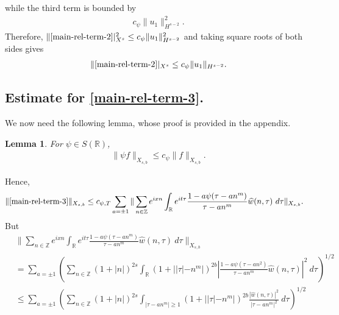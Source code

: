 \documentclass[12pt,reqno]{amsart}
\numberwithin{equation}{section}  %
\numberwithin{figure}{section}
\newcommand{\rr}{\mathbb{R}}
\newcommand{\zz}{\mathbb{Z}}
\newcommand{\wh}{\widehat}
\theoremstyle{plain}
\newtheorem{lemma}{Lemma}
\theoremstyle{definition}
\theoremstyle{remark}
\begin{document}
while the third term is bounded by  
%
%
\begin{equation*}
\begin{split}
  c_{\psi} \| u_{1} \|_{H^{s-2}}^{2}.
\end{split}
\end{equation*}
%
%
Therefore, 
$\|\eqref{main-rel-term-2}|_{X^{s}}^{2} \le c_{\psi}
\|u_{1}\|_{H^{s-2}}^2$ and
taking square roots of both sides gives
%
%
\begin{equation*}
  \begin{split}
    \|\eqref{main-rel-term-2}|_{X^{s}} \le c_{\psi}
    \|u_{1}\|_{H^{s-2}}.
  \end{split}
\end{equation*}
%
%
%
%
\subsection{Estimate for \eqref{main-rel-term-3}.}
We now need the following lemma, whose proof is provided in the appendix.
%
%
%
%
%
%
%
%
\begin{lemma}
\label{lem:schwartz-mult}
	For $\psi \in S(\rr)$,
%
%
\begin{equation}
	\label{schwartz-mult}
	\begin{split}
    \|\psi f \|_{X_{s,b}} \le c_{\psi} \|f \|_{X_{s,b}}.
	\end{split}
\end{equation}
%
%
\end{lemma}
%
%
Hence,
%
%
\begin{equation}
  \label{yu}
	\begin{split}
		\|\eqref{main-rel-term-3}\|_{X_{s,b}} 
    & \le c_{\psi, T}
    \sum_{a = \pm 1} \| \sum_{n \in \zz} e^{ixn} \int_\rr 
		e^{it \tau} \frac{ 1 - a\psi (\tau - an^{m} ) 
		}{\tau - an^{m}} \wh{w}(n, \tau) \ 
		d \tau\|_{X_{s,b}}.
			\end{split}
\end{equation}
%
But
%
%
\begin{equation}
\label{main-int2-est-X-s-part}
\begin{split}
  & \| \sum_{n \in \zz} e^{ixn} \int_\rr 
		e^{it \tau} \frac{ 1 - a\psi (\tau - an^{m} ) 
		}{\tau - an^{m}} \wh{w}(n, \tau) \ 
		d \tau\|_{X_{s,b}}
		\\
    & = \sum_{a = \pm 1}\left( \sum_{n \in \zz} \left (1 + |n| \right )^{2s} \int_\rr
    (1 + |  |\tau| - n^{m}|)^{2b} \left | \frac{1 - a\psi(\tau - an^{2 
		})}{\tau - an^{m}} 
		\wh{w}(n, \tau) \right |^2 \ d 
		\tau \right)^{1/2}
		\\
    & \le \sum_{a = \pm 1}
    \left( \sum_{n \in \zz} \left (1 + |n| \right )^{2s} \int_{| \tau - an^{m }| \ge 1}
    (1 + | |\tau| - n^{m}|)^{2b} \frac{|\wh{w}(n, \tau)|^2 }{|\tau - an^{m }|^2} 
		\ d 
		\tau \right)^{1/2}
  \end{split}
\end{equation}
\end{document}
